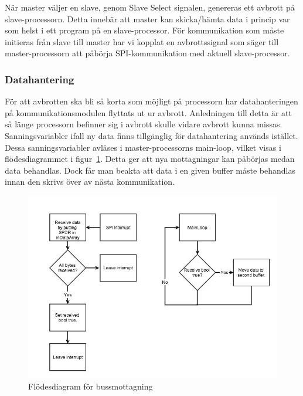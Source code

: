 \documentclass[a4paper,12pt,fleqn]{article}
\begin{document}
När master väljer en slave, genom Slave Select signalen, genereras ett avbrott på slave-processorn. Detta innebär att master kan skicka/hämta data i princip var som helst i ett program på en slave-processor. För kommunikation som måste initieras från slave till master har vi kopplat en avbrottssignal som säger till master-processorn att påbörja SPI-kommunikation med aktuell slave-processor.

\subsubsection{Datahantering}
För att avbrotten ska bli så korta som möjligt på processorn har datahanteringen på kommunikationsmodulen flyttats ut ur avbrott. Anledningen till detta är att så länge processorn befinner sig i avbrott skulle vidare avbrott kunna missas. Sanningsvariabler ifall ny data finns tillgänglig för datahantering används istället. Dessa sanningsvariabler avläses i master-processorns main-loop, vilket visas i flödesdiagrammet i figur~\ref{fig:SPIrec}. Detta ger att nya mottagningar kan påbörjas medan data behandlas. Dock får man beakta att data i en given buffer måste behandlas innan den skrivs över av nästa kommunikation.

\begin{figure}[htp] %
  \begin{center}
  \includegraphics[keepaspectratio=true,scale=0.5]{spirec.jpg}  %
  \end{center}
  \caption{Flödesdiagram för bussmottagning} %
  \label{fig:SPIrec}
\end{figure}
\end{document}
